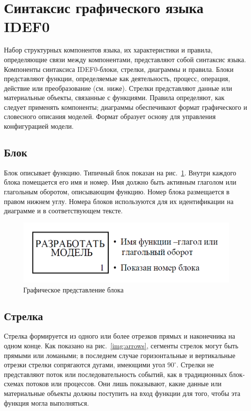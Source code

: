 \documentclass[a4paper, final]{article}
\begin{document}
\newpage
\section{Синтаксис графического языка IDEF0}
Набор структурных компонентов языка, их характеристики и правила, определяющие связи между компонентами, представляют собой синтаксис языка.
Компоненты синтаксиса IDEF0-блоки, стрелки, диаграммы и правила. Блоки представляют функции, определяемые как деятельность, процесс, операция, действие или преобразование (см. ниже). Стрелки представляют данные или материальные объекты, связанные с функциями. Правила определяют, как следует применять компоненты; диаграммы обеспечивают формат графического и словесного описания моделей. Формат образует основу для управления конфигурацией модели.

\subsection{Блок}
Блок описывает функцию. Типичный блок показан на рис.~\ref{img:block}. Внутри каждого блока помещается его имя и номер. Имя должно быть активным
глаголом или глагольным оборотом, описывающим функцию. Номер блока размещается в правом нижнем углу. Номера блоков используются для их идентификации на диаграмме и в соответствующем тексте.

\begin{figure}[H]
   \centering
   \includegraphics[width=0.7\linewidth]{block.png}
   \caption{Графическое представление блока}
   \label{img:block}
\end{figure}

\subsection{Стрелка}
Стрелка формируется из одного или более отрезков прямых и наконечника на одном конце. Как показано на рис.~\ref{img:arrows}, сегменты стрелок могут быть прямыми или ломаными; в последнем случае горизонтальные и вертикальные отрезки стрелки сопрягаются дугами, имеющими угол $90^\circ$. Стрелки не представляют поток или последовательность событий, как в традиционных блок-схемах потоков или процессов. Они лишь показывают, какие данные или материальные объекты должны поступить на вход функции для того, чтобы эта функция могла выполняться.
\end{document}
